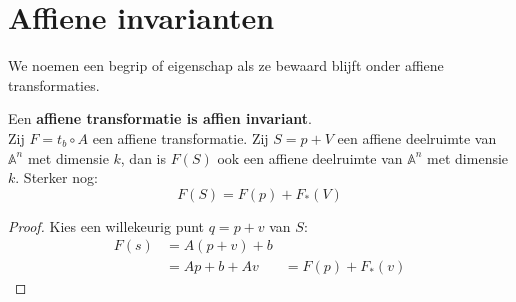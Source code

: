 \documentclass[main.tex]{subfiles}
\begin{document}
\section{Affiene invarianten}
\label{sec:affiene-invarianten}

\begin{de}
  We noemen een begrip of eigenschap  als ze bewaard blijft onder affiene transformaties.
\end{de}

\begin{st}
  \label{st:affiene-transformatie-deelruimte-invariant}
  Een \textbf{affiene transformatie is affien invariant}.\\
  Zij $F = t_{b} \circ A$ een affiene transformatie.
  Zij $S = p+V$ een affiene deelruimte van $\mathbb{A}^{n}$ met dimensie $k$, dan is $F(S)$ ook een affiene deelruimte van $\mathbb{A}^{n}$ met dimensie $k$.
  Sterker nog:
  \[ F(S) = F(p) + F_{*}(V) \]

  \begin{proof}
    Kies een willekeurig punt $q= p+v$ van $S$:
    \[
    \begin{array}{rll}
    F(s) &= A(p+v) + b &\\
         &= Ap + b + Av &= F(p) + F_{*}(v)      
    \end{array}
    \]
  \end{proof}
\end{st}
\end{document}
